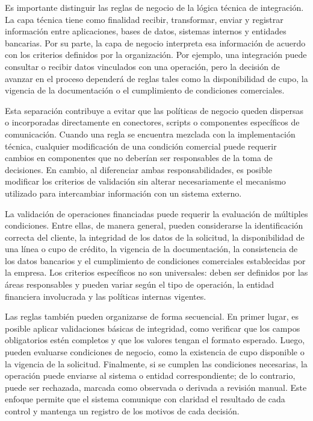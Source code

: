 Es importante distinguir las reglas de negocio de la lógica técnica de integración. La capa técnica tiene como finalidad recibir, transformar, enviar y registrar información entre aplicaciones, bases de datos, sistemas internos y entidades bancarias. Por su parte, la capa de negocio interpreta esa información de acuerdo con los criterios definidos por la organización. Por ejemplo, una integración puede consultar o recibir datos vinculados con una operación, pero la decisión de avanzar en el proceso dependerá de reglas tales como la disponibilidad de cupo, la vigencia de la documentación o el cumplimiento de condiciones comerciales.

Esta separación contribuye a evitar que las políticas de negocio queden dispersas o incorporadas directamente en conectores, scripts o componentes específicos de comunicación. Cuando una regla se encuentra mezclada con la implementación técnica, cualquier modificación de una condición comercial puede requerir cambios en componentes que no deberían ser responsables de la toma de decisiones. En cambio, al diferenciar ambas responsabilidades, es posible modificar los criterios de validación sin alterar necesariamente el mecanismo utilizado para intercambiar información con un sistema externo.

La validación de operaciones financiadas puede requerir la evaluación de múltiples condiciones. Entre ellas, de manera general, pueden considerarse la identificación correcta del cliente, la integridad de los datos de la solicitud, la disponibilidad de una línea o cupo de crédito, la vigencia de la documentación, la consistencia de los datos bancarios y el cumplimiento de condiciones comerciales establecidas por la empresa. Los criterios específicos no son universales: deben ser definidos por las áreas responsables y pueden variar según el tipo de operación, la entidad financiera involucrada y las políticas internas vigentes.

Las reglas también pueden organizarse de forma secuencial. En primer lugar, es posible aplicar validaciones básicas de integridad, como verificar que los campos obligatorios estén completos y que los valores tengan el formato esperado. Luego, pueden evaluarse condiciones de negocio, como la existencia de cupo disponible o la vigencia de la solicitud. Finalmente, si se cumplen las condiciones necesarias, la operación puede enviarse al sistema o entidad correspondiente; de lo contrario, puede ser rechazada, marcada como observada o derivada a revisión manual. Este enfoque permite que el sistema comunique con claridad el resultado de cada control y mantenga un registro de los motivos de cada decisión.

